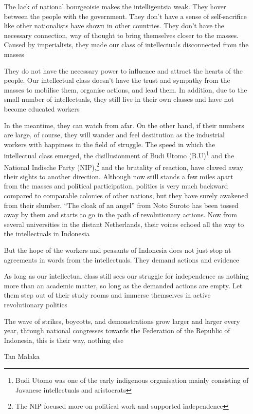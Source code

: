 The lack of national bourgeoisie makes the intelligentsia weak. They hover between the people with the government. 
They don't have a sense of self-sacrifice like other nationalists have shown in other countries. They don't have the 
necessary connection, way of thought to bring themselves closer to the masses. Caused by imperialists, they made our class 
of intellectuals disconnected from the masses\nline

They do not have the necessary power to influence and attract the hearts of the people. Our 
intellectual class doesn't have the trust and sympathy from the masses to mobilise them, organise actions, 
and lead them. In addition, due to the small number of intellectuals, they still live in their own classes and 
have not become educated workers\nline

In the meantime, they can watch from afar. On the other hand, if their numbers are large, of course, 
they will wander and feel destitution as the industrial workers with happiness in the field of struggle.
The speed in which the intellectual class emerged, the disillusionment of Budi Utomo (B.U)\footnote[2]{Budi Utomo was one of the early indigenous organisation mainly consisting of Javanese intellectuals and aristocrats}
and the National Indische Party (NIP),\footnote[3]{The NIP focused more on political work and supported independence}
and the brutality of reaction, have clawed away their sights to another direction. Although now still stands a few miles apart 
from the masses and political participation, politics is very much backward compared to comparable colonies of other nations, 
but they have surely awakened from their slumber. “The cloak of an angel” from Noto Suroto has been tossed away by them and 
starts to go in the path of revolutionary actions. Now from several universities in the distant Netherlands, their voices 
echoed all the way to the intellectuals in Indonesia\nline

But the hope of the workers and peasants of Indonesia does not just stop at agreements in words from the intellectuals. 
They demand actions and evidence\nline

As long as our intellectual class still sees our struggle for independence as nothing more than an academic matter, 
so long as the demanded actions are empty. Let them step out of their study rooms and immerse themselves in active revolutionary politics\nline

The wave of strikes, boycotts, and demonstrations grow larger and larger every year, through national congresses 
towards the Federation of the Republic of Indonesia, this is their way, nothing else\nline

\begin{flushright}
    Tan Malaka
\end{flushright}
